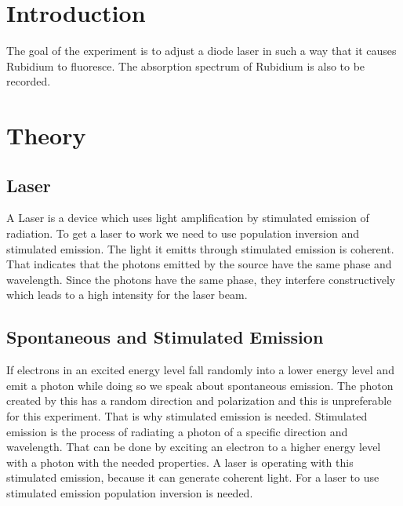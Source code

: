 
\section{Introduction}
The goal of the experiment is to adjust a diode laser in such a way that it causes Rubidium to fluoresce. The absorption spectrum of Rubidium is also to be recorded.
\section{Theory}
\subsection{Laser}
A Laser is a device which uses light amplification by stimulated emission of radiation. To get a laser to work we need to use population inversion and stimulated emission. The light it emitts through stimulated emission is coherent. That indicates that the photons emitted by the source have the same phase and wavelength. Since the photons have the same phase, they interfere constructively which leads to a high intensity for the laser beam.
\subsection{Spontaneous and Stimulated Emission}
If electrons in an excited energy level fall randomly into a lower energy level and emit a photon while doing so we speak about spontaneous emission. The photon created by this has a random direction and polarization and this is unpreferable for this experiment. That is why stimulated emission is needed. Stimulated emission is the process of radiating a photon of a specific direction and wavelength. That can be done by exciting an electron to a higher energy level with a photon with the needed properties. A laser is operating with this stimulated emission, because it can generate coherent light. For a laser to use stimulated emission population inversion is needed.
